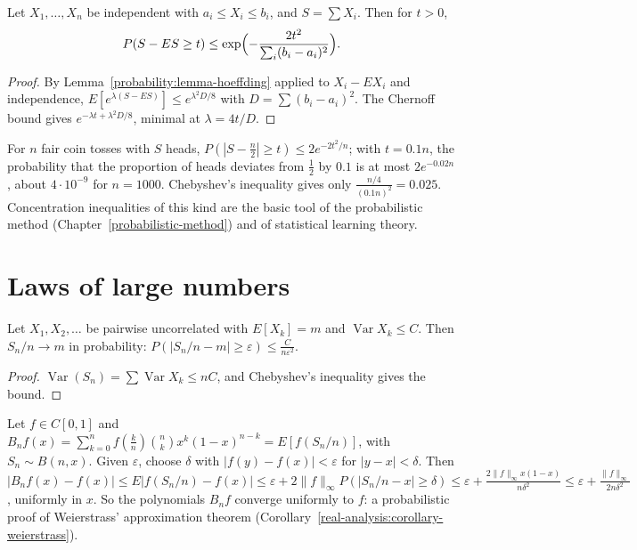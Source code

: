 \begin{theorem}\label{probability:theorem-hoeffding}
Let $X_1, \ldots, X_n$ be independent with $a_i \leq X_i \leq b_i$, and $S = \sum X_i$. Then for $t > 0$,
\[
P(S - ES \geq t) \leq \exp\Bigl(-\frac{2t^2}{\sum_i(b_i - a_i)^2}\Bigr).
\]
\end{theorem}

\begin{proof}
By Lemma~\ref{probability:lemma-hoeffding} applied to $X_i - EX_i$ and independence, $E[e^{\lambda(S - ES)}] \leq e^{\lambda^2D/8}$ with $D = \sum(b_i - a_i)^2$. The Chernoff bound gives $e^{-\lambda t + \lambda^2D/8}$, minimal at $\lambda = 4t/D$.
\end{proof}

\begin{example}\label{probability:example-hoeffding}
For $n$ fair coin tosses with $S$ heads, $P(|S - \frac n2| \geq t) \leq 2e^{-2t^2/n}$; with $t = 0.1n$, the probability that the proportion of heads deviates from $\frac12$ by $0.1$ is at most $2e^{-0.02n}$, about $4 \cdot 10^{-9}$
for $n = 1000$. Chebyshev's inequality gives only $\frac{n/4}{(0.1n)^2} = 0.025$. Concentration inequalities of this kind are the basic tool of the probabilistic method (Chapter~\ref{probabilistic-method}) and of statistical
learning theory.
\end{example}

\section{Laws of large numbers}\label{probability:section-lln}

\begin{theorem}\label{probability:theorem-weak-law}
Let $X_1, X_2, \ldots$ be pairwise uncorrelated with $E[X_k] = m$ and $\operatorname{Var}X_k \leq C$. Then $S_n/n \to m$ in probability: $P(|S_n/n - m| \geq \varepsilon) \leq \frac{C}{n\varepsilon^2}$.
\end{theorem}

\begin{proof}
$\operatorname{Var}(S_n) = \sum\operatorname{Var}X_k \leq nC$, and Chebyshev's inequality gives the bound.
\end{proof}

\begin{example}\label{probability:example-bernstein}
Let $f \in C[0, 1]$ and $B_nf(x) = \sum_{k=0}^nf(\frac kn)\binom nkx^k(1 - x)^{n-k} = E[f(S_n/n)]$, with $S_n \sim B(n, x)$. Given $\varepsilon$, choose $\delta$ with $|f(y) - f(x)| < \varepsilon$ for $|y - x| < \delta$. Then
$|B_nf(x) - f(x)| \leq E|f(S_n/n) - f(x)| \leq \varepsilon + 2\|f\|_\infty P(|S_n/n - x| \geq \delta) \leq \varepsilon + \frac{2\|f\|_\infty x(1 - x)}{n\delta^2} \leq \varepsilon + \frac{\|f\|_\infty}{2n\delta^2}$, uniformly in $x$. So the polynomials $B_nf$
converge uniformly to $f$: a probabilistic proof of Weierstrass' approximation theorem (Corollary~\ref{real-analysis:corollary-weierstrass}).
\end{example}

